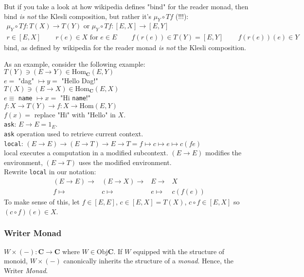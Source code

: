 \documentclass[10pt]{amsart}
\begin{document}
\begin{multicols*}{2}
But if you take a look at how wikipedia defines "bind" for the reader monad, then bind \emph{is not} the Klesli composition, but rather it's $\mu_Y \circ Tf$ (!!!):
\begin{equation}
\begin{gathered}
\mu_Y \circ Tf: T(X) \to T(Y) \text{ or } \mu_Y \circ Tf : [E, X] \to [E, Y] \\ 
r \in [E,X] \qquad \, r(e) \in X \text{ for } e \in E \qquad \, f(r(e)) \in T(Y) = [E,Y] \qquad \, f(r(e))(e) \in Y
\end{gathered}
\end{equation}
bind, as defined by wikipedia for the reader monad \emph{is not} the Klesli composition.

As an example, consider the following example: \\
$T(Y) \ni (E\to Y) \in \text{Hom}_{\mathbf{C}}(E,Y)$ \\
$e = $ "dag" $\mapsto y = $ "Hello Dag!" \\

$T(X) \ni (E\to X) \in \text{Hom}_{\mathbf{C}}(E,X)$ \\
$e \equiv $ \texttt{name} $\mapsto x = $ "Hi \texttt{name}!" \\

$f:X\to T(Y) \to f:X\to \text{Hom}{(E,Y)}$ \\
$f(x) = $ replace "Hi" with "Hello" in $X$. \\

\texttt{ask}: $E\to E = 1_E$. \\
\texttt{ask} operation used to retrieve current context. \\

\texttt{local}: $(E\to E) \to (E\to T) \to E \to T = f \mapsto c \mapsto e \mapsto c(fe)$ \\
local executes a computation in a modified subcontext. $(E\to E)$ modifies the environment, $(E\to T)$ uses the modified environment. \\
Rewrite \texttt{local} in our notation: \\
\[
\begin{aligned} 
	& (E\to E) \to & (E\to X) \to & E \to & X \\
	& f \mapsto & c \mapsto & e \mapsto & c(f(e))
\end{aligned}
\]
To make sense of this, let $f \in [E, E]$, $c\in [E,X] = T(X)$, $c\circ f \in [E, X]$ so $(c\circ f)(e) \in X$. \\


\subsubsection{Writer Monad} $W \times (-) : \mathbf{C} \to \mathbf{C}$ where $W \in \text{Obj}{\mathbf{C}}$. If $W$ equipped with the structure of monoid, $W \times (-)$ canonically inherits the structure of a \emph{monad}. Hence, the Writer \emph{Monad}.  


\end{multicols*}
\end{document}
